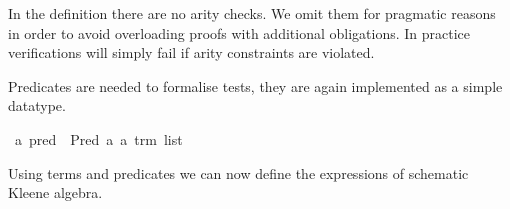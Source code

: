 \documentclass{llncs}
\begin{document}
In the definition there are no arity checks. We omit them for
pragmatic reasons in order to avoid overloading proofs with additional
obligations. In practice verifications will simply fail if arity
constraints are violated.

Predicates are needed to formalise tests, they are again implemented
as a simple datatype.

\begin{isabellebody}
\isanewline
{}\isamarkupfalse%
\ {}a\ pred\ {}\ Pred\ {}a\ {}{}a\ trm\ list{}\isanewline
\end{isabellebody}

Using terms and predicates we can now define the expressions of
schematic Kleene algebra.
\end{document}
